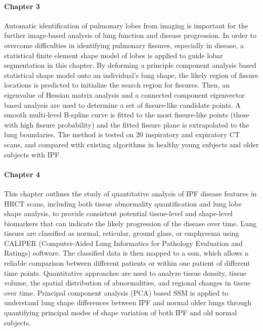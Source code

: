 \paragraph{Chapter 3} Automatic identification of pulmonary lobes from imaging is important for the further image-based analysis of lung function and disease progression. In order to overcome difficulties in identifying pulmonary fissures, especially in disease, a statistical finite element shape model of lobes is applied to guide lobar segmentation in this chapter. By deforming a principle component analysis based statistical shape model onto an individual’s lung shape, the likely region of fissure locations is predicted to initialize the search region for fissures. Then, an eigenvalue of Hessian matrix analysis and a connected component eigenvector based analysis are used to determine a set of fissure-like candidate points. A smooth multi-level B-spline curve is fitted to the most fissure-like points (those with high fissure probability) and the fitted fissure plane is extrapolated to the lung boundaries. The method is tested on 20 inspiratory and expiratory CT scans, and compared with existing algorithms in healthy young subjects and older subjects with IPF.
\paragraph{Chapter 4} This chapter outlines the study of quantitative analysis of IPF disease features in HRCT scans, including both tissue abnormality quantification and lung lobe shape analysis, to provide consistent potential tissue-level and shape-level biomarkers that can indicate the likely progression of the disease over time. Lung tissues are classified as normal, reticular, ground glass, or emphysema using CALIPER (Computer-Aided Lung Informatics for Pathology Evaluation and Ratings) software. The classified data is then mapped to a \gls{ssm}, which allows a reliable comparison between different patients or within one patient of different time points. Quantitative approaches are used to analyze tissue density, tissue volume, the spatial distribution of abnormalities, and regional changes in tissue over time. Principal component analysis (PCA) based SSM is applied to understand lung shape differences between IPF and normal older lungs through quantifying principal modes of shape variation of both IPF and old normal subjects. 
